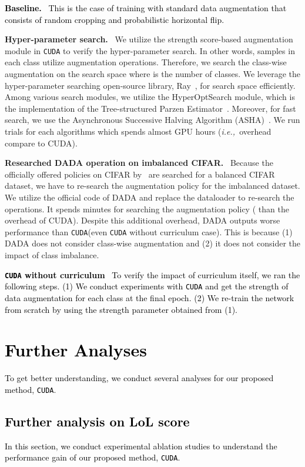 \documentclass{article}
\newcommand{\ie}{\emph{i.e.,~}}
\newcommand{\myparagraph}[1]{\vspace{0.07cm}\noindent\textbf{#1}~}
\def\code#1{\texttt{#1}}
\newcommand{\alg}{\code{CUDA}\xspace}
\renewcommand*\cite[1]{\citep{#1}}
\newcommand{\rebut}[1]{\textcolor{black}{#1}}
\begin{document}
\rebut{
\myparagraph{Baseline.}
This is the case of training with standard data augmentation that consists of random cropping and probabilistic horizontal flip.
}

\myparagraph{Hyper-parameter search.} We utilize the strength score-based augmentation module in \alg to verify the hyper-parameter search. In other words, samples in each class utilize  augmentation operations. Therefore, we search the class-wise augmentation on the search space  where  is the number of classes. We leverage the hyper-parameter searching open-source library, Ray~\cite{liaw2018tune}, for search  space efficiently. Among various search modules, we utilize the HyperOptSearch module, which is the implementation of the Tree-structured Parzen Estimator~\cite{bergstra2013making}. Moreover, for fast search, we use the Asynchronous Successive Halving Algorithm (ASHA)~\cite{li2020system}. We run  trials for each algorithms which spends almost  GPU hours (\ie  overhead compare to CUDA).

\myparagraph{Researched DADA operation on imbalanced CIFAR.}
Because the officially offered policies on CIFAR by~\citet{li2020dada} are searched for a balanced CIFAR dataset, we have to re-search the augmentation policy for the imbalanced dataset. We utilize the official code of DADA and replace the dataloader to re-search the operations. It spends  minutes for searching the augmentation policy ( than the overhead of CUDA). Despite this additional overhead, DADA outputs worse performance than \alg (even \alg without curriculum case). This is because (1) DADA does not consider class-wise augmentation and (2) it does not consider the impact of class imbalance.

\rebut{
\myparagraph{\alg without curriculum}
To verify the impact of curriculum itself, we ran the following steps. (1) We conduct experiments with \alg and get the strength of data augmentation for each class at the final epoch. (2) We re-train the network from scratch by using the strength parameter obtained from (1).
} 
\section{\rebut{Further Analyses}}
\label{app: rebuttal}
\rebut{
To get better understanding, we conduct several analyses for our proposed method, \alg.
}

\subsection{\rebut{Further analysis on LoL score}}
\rebut{
In this section, we conduct experimental ablation studies to understand the performance gain of our proposed method, \alg.}
\end{document}
